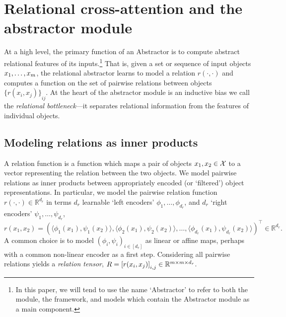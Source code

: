 \section{Relational cross-attention and the abstractor module}\label{sec:abstractor_module}

At a high level, the primary function of an Abstractor is to compute abstract relational features of its inputs.\footnote{In this paper, we will tend to use the name `Abstractor' to refer to both the module, the framework, and models which contain the Abstractor module as a main component.} That is, given a set or sequence of input objects $x_1, \ldots, x_m$, the relational abstractor learns to model a relation $r(\cdot, \cdot)$ and computes a function on the set of pairwise relations between objects ${\{ r(x_i, x_j) \}}_{ij}$. At the heart of the abstractor module is an inductive bias we call the \textit{relational bottleneck}---it separates relational information from the features of individual objects.


\subsection{Modeling relations as inner products}\label{ssec:relations_as_inner_prods}

A relation function is a function which maps a pair of objects $x_1, x_2 \in {\mathcal{X}}$ to a vector representing the relation between the two objects. We model pairwise relations as inner products between appropriately encoded (or `filtered') object representations. In particular, we model the pairwise relation function $r(\cdot, \cdot) \in \mathbb{R}^{d_r}$ in terms $d_r$ learnable `left encoders' $\phi_1, \ldots, \phi_{d_r}$, and $d_r$ `right encoders' $\psi_1, \ldots, \psi_{d_r}$,
\begin{equation}\label{eq:inner_prod_rel}
    r(x_1,x_2) = \left(\langle \phi_1(x_1), \psi_1(x_2) \rangle, \langle \phi_2(x_1), \psi_2(x_2) \rangle, \ldots, \langle \phi_{d_r}(x_1), \psi_{d_r}(x_2) \rangle \right)^\top \in \mathbb{R}^{d_r}.
\end{equation}
A common choice is to model $(\phi_i, \psi_i)_{i\in [d_r]}$ as linear or affine maps, perhaps with a common non-linear encoder as a first step. Considering all pairwise relations yields a \textit{relation tensor}, $R = \left[r(x_i, x_j)\right]_{i,j} \in \mathbb{R}^{m \times m \times d_r}$.

